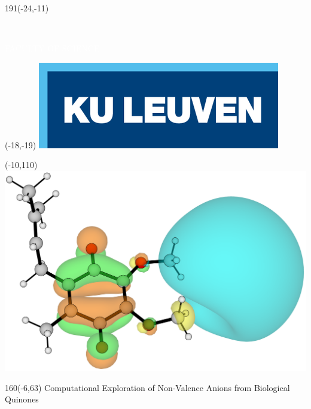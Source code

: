 \documentclass[12pt,a4paper,oneside]{book}
\begin{document}
\thispagestyle{empty}
\newcommand{\form}[1]{\scalebox{1.087}{\boldmath{#1}}}
\sffamily %
%
\begin{textblock}{191}(-24,-11)
\colorbox{bluetitle}{\hspace{139mm}\ \parbox[c][18truemm]{52mm}{\textcolor{white}{FACULTY OF SCIENCE}}}
\end{textblock}
%
\begin{textblock}{70}(-18,-19)
\textblockcolour{}
\includegraphics*[height=19.8truemm]{LogoKULeuven}
\end{textblock}
%
\begin{textblock}{70}(-10,110)
\textblockcolour{}
\includegraphics*[scale=0.9]{Q1_cover.png}
\end{textblock}
%
\begin{textblock}{160}(-6,63)
\textblockcolour{}
\vspace{-\parskip}
\flushleft
\fontsize{35}{37}\selectfont \textcolor{bluetitle}{Computational Exploration of Non-Valence Anions from Biological Quinones}\\[1.5mm]
\end{textblock}
\end{document}
